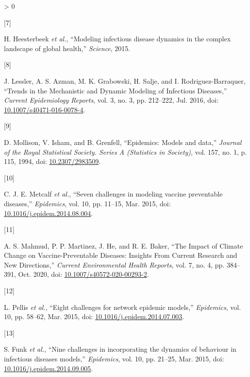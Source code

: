 \documentclass[
  oneside]{book}
\newlength{\cslhangindent}
\newlength{\csllabelwidth}
\newenvironment{CSLReferences}[2] %
 {%
  \setlength{\parindent}{0pt}
  \ifodd #1 \everypar{\setlength{\hangindent}{\cslhangindent}}\ignorespaces\fi
  \ifnum #2 > 0
  \setlength{\parskip}{#2\baselineskip}
  \fi
 }%
 {}
\newcommand{\CSLLeftMargin}[1]{\parbox[t]{\csllabelwidth}{#1}}
\newcommand{\CSLRightInline}[1]{\parbox[t]{\linewidth - \csllabelwidth}{#1}\break}
\begin{document}
\begin{CSLReferences}{0}{0}
\leavevmode\hypertarget{ref-heesterbeek2015}{}%
\CSLLeftMargin{{[}7{]} }
\CSLRightInline{H. Heesterbeek \emph{et al.}, {``Modeling infectious disease dynamics in the complex landscape of global health,''} \emph{Science}, 2015.}

\leavevmode\hypertarget{ref-lessler2016}{}%
\CSLLeftMargin{{[}8{]} }
\CSLRightInline{J. Lessler, A. S. Azman, M. K. Grabowski, H. Salje, and I. Rodriguez-Barraquer, {``Trends in the Mechanistic and Dynamic Modeling of Infectious Diseases,''} \emph{Current Epidemiology Reports}, vol. 3, no. 3, pp. 212--222, Jul. 2016, doi: \href{https://doi.org/10.1007/s40471-016-0078-4}{10.1007/s40471-016-0078-4}.}

\leavevmode\hypertarget{ref-mollison1994}{}%
\CSLLeftMargin{{[}9{]} }
\CSLRightInline{D. Mollison, V. Isham, and B. Grenfell, {``Epidemics: Models and data,''} \emph{Journal of the Royal Statistical Society. Series A (Statistics in Society)}, vol. 157, no. 1, p. 115, 1994, doi: \href{https://doi.org/10.2307/2983509}{10.2307/2983509}.}

\leavevmode\hypertarget{ref-metcalf2015}{}%
\CSLLeftMargin{{[}10{]} }
\CSLRightInline{C. J. E. Metcalf \emph{et al.}, {``Seven challenges in modeling vaccine preventable diseases,''} \emph{Epidemics}, vol. 10, pp. 11--15, Mar. 2015, doi: \href{https://doi.org/10.1016/j.epidem.2014.08.004}{10.1016/j.epidem.2014.08.004}.}

\leavevmode\hypertarget{ref-mahmud2020}{}%
\CSLLeftMargin{{[}11{]} }
\CSLRightInline{A. S. Mahmud, P. P. Martinez, J. He, and R. E. Baker, {``The Impact of Climate Change on Vaccine-Preventable Diseases: Insights From Current Research and New Directions,''} \emph{Current Environmental Health Reports}, vol. 7, no. 4, pp. 384--391, Oct. 2020, doi: \href{https://doi.org/10.1007/s40572-020-00293-2}{10.1007/s40572-020-00293-2}.}

\leavevmode\hypertarget{ref-pellis2015}{}%
\CSLLeftMargin{{[}12{]} }
\CSLRightInline{L. Pellis \emph{et al.}, {``Eight challenges for network epidemic models,''} \emph{Epidemics}, vol. 10, pp. 58--62, Mar. 2015, doi: \href{https://doi.org/10.1016/j.epidem.2014.07.003}{10.1016/j.epidem.2014.07.003}.}

\leavevmode\hypertarget{ref-funk2015}{}%
\CSLLeftMargin{{[}13{]} }
\CSLRightInline{S. Funk \emph{et al.}, {``Nine challenges in incorporating the dynamics of behaviour in infectious diseases models,''} \emph{Epidemics}, vol. 10, pp. 21--25, Mar. 2015, doi: \href{https://doi.org/10.1016/j.epidem.2014.09.005}{10.1016/j.epidem.2014.09.005}.}


\end{CSLReferences}
\end{document}
